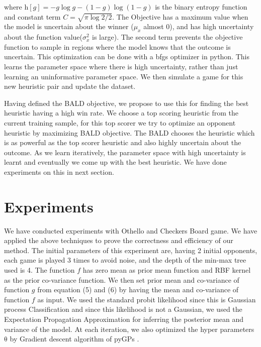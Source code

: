 \documentclass{scrartcl}
\begin{document}
{\vspace{-0.6cm}

\hfill 

\normalsize
where $\mathrm{h}[g]=- g\log g - (1-g)\log(1-g)$ is the binary entropy function and constant term $C=\sqrt{\pi\log 2 / 2}$. The Objective has a maximum value when the model is uncertain about the winner ($\mu_x$ almost 0), and has high uncertainty about the function value($\sigma_x^2$ is large). The second term prevents the objective function to sample in regions where the model knows that the outcome is uncertain. This optimization can be done with a bfgs optimizer in python. This learns the parameter space where there is high uncertainty, rather than just learning an uninformative parameter space. We then simulate a game for this new heuristic pair and update the dataset. 

 Having defined the BALD objective, we propose to use this for finding the best heuristic having a high win rate. We choose a top scoring heuristic from the current training sample, for this top scorer we try to optimize an opponent heuristic by maximizing BALD objective. The BALD chooses the heuristic which is as powerful as the top scorer heuristic and also highly uncertain about the outcome. As we learn iteratively, the parameter space with high uncertainty is learnt and eventually we come up with the best heuristic. We have done experiments on this in next section.

\newpage

\section{Experiments}

We have conducted experiments with Othello and Checkers Board game. We have applied the above techniques to prove the correctness and efficiency of our method. The initial parameters of this experiment are, having 2 initial opponents, each game is played 3 times to avoid noise, and the depth of the min-max tree used is 4. The function $f$ has zero mean as prior mean function and RBF kernel as the prior co-variance function. We then set prior mean and co-variance of function $g$ from equation (5) and (6) by having the mean and co-variance of function $f$ as input. We used the standard probit likelihood since this is Gaussian process Classification and since this likelihood is not a Gaussian, we used the Expectation Propagation Approximation for inferring the posterior mean and variance of the model. At each iteration, we also optimized the hyper parameters $\mathrm{\theta}$ by Gradient descent algorithm of pyGPs \cite{NeuMarHuaKer15}.


}
\end{document}
